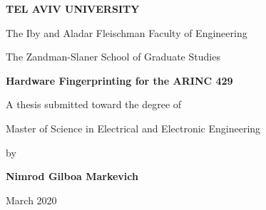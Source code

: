\begin{titlepage}
\begin{center}
  \vspace*{1cm}
  
  \Large
  \textbf{TEL AVIV UNIVERSITY}
  
  \normalsize
  The Iby and Aladar Fleischman Faculty of Engineering
  
  The Zandman-Slaner School of Graduate Studies
  
  \vspace{0.5cm}
  \LARGE
  \textbf{Hardware Fingerprinting for the ARINC 429}
  
  \vspace{0.5cm}
  
  \vspace{1cm}
  \normalsize
   A thesis submitted toward the degree of
   
   Master of Science in Electrical and Electronic Engineering
   
   \vspace{0.5cm}
   by
   
  \Large
  \textbf{Nimrod Gilboa Markevich}
  
  \vspace{0.5cm}
  \large
  March 2020
\end{center}
\end{titlepage}
